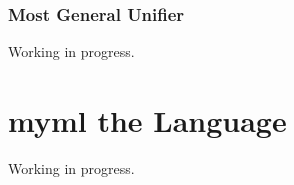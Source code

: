 \documentclass{report}
\newcommand{\theLang}{myml}
\newcommand{\code}{\mathtt}
\newcommand{\ruleTag}[1]{\label{#1}\tag{\textsc{#1}}}
\DeclareMathOperator{\mostGeneralUnifier}{mgu}
\newcommand{\newVariable}{newvar}
\newcommand{\entails}{\vdash}
\newcommand{\typingRelation}[4]{#1 \entails #2 \;:\; #3 ,\; #4}
\newcommand{\composite}{\circ}
\begin{document}

\subsection{Most General Unifier}

Working in progress.

\chapter{\theLang{} the Language}

Working in progress.
\end{document}
